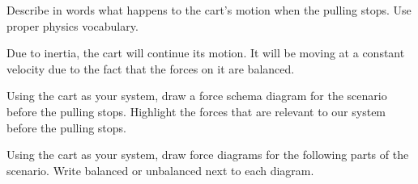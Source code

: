 \documentclass[../main-physics-problems.tex]{subfiles}
\begin{document}
\begin{questions}
\question
Describe in words what happens to the cart's motion when the pulling stops. Use proper physics vocabulary.

\ifprintanswers
\else
\fillwithlines{3cm}
\fi

\begin{solution}
    Due to inertia, the cart will continue its motion. It will be moving at a constant velocity due to the fact that the forces on it are balanced.
\end{solution}

\question
Using the cart as your system, draw a force schema diagram for the scenario before the pulling stops. Highlight the forces that are relevant to our system before the pulling stops. 

\begin{solutionorbox}[3cm]
    
\end{solutionorbox}


\question
Using the cart as your system, draw force diagrams for the following parts of the scenario. Write balanced or unbalanced next to each diagram.

\end{questions}
\end{document}
